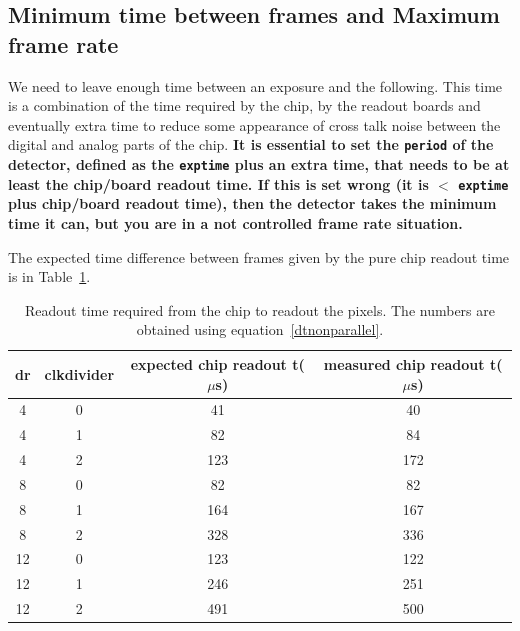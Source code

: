 \documentclass{article}
\begin{document}
{{{\subsection{Minimum time between frames and Maximum frame rate}

We need to leave enough time between an exposure and the following. This time is a combination of the time required by the chip, by the readout boards and eventually extra time to reduce some appearance of cross talk noise between the digital and analog parts of the chip. 
\textbf{It is essential to set the {\tt{period}} of the detector, defined as the {\tt{exptime}} plus an extra time, that needs to be at least the chip/board readout time. If this is set wrong (it is $<$ {\tt{exptime}} plus chip/board readout time), then the detector takes the minimum time it can, but you are in a not controlled frame rate situation.} 

The expected time difference between frames given by the pure chip readout time is in Table~\ref{tchipro}.    
\begin{tiny}
\begin{table}
\begin{flushleft}
\begin{tabular}{|c|c|c|c|}
\hline
\tiny{dr} & \tiny{clkdivider} & \tiny{expected chip readout t($\mu$s)} & \tiny{measured chip readout t($\mu$s)}\\
\hline
4 & 0 & 41 & 40\\
4 & 1 & 82 & 84\\
4 & 2 & 123 & 172\\
\hline
\hline
8 & 0 & 82 & 82\\
8 & 1 & 164 & 167\\
8 & 2 & 328 & 336\\
\hline
\hline
12 & 0 & 123 &122\\
12 & 1 & 246 & 251\\
12 & 2 & 491 & 500\\
\hline
\end{tabular}
\caption{Readout time required from the chip to readout the pixels. The numbers are obtained using equation~\ref{dtnonparallel}.}
\label{tchipro}
\end{flushleft}
\end{table}
\end{tiny}

}}}
\end{document}
